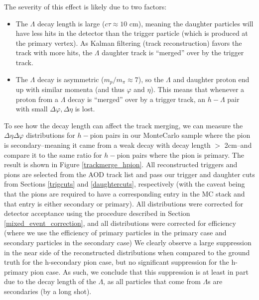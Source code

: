 \documentclass[ALICE,manyauthors]{ALICE_analysis_notes}
\begin{document}
The severity of this effect is likely due to two factors:
\begin{itemize}
\item The $\Lambda$ decay length is large ($c\tau \approx 10$ cm), meaning the daughter particles will have less hits in the detector than the trigger particle (which is produced at the primary vertex). As Kalman filtering (track reconstruction) favors the track with more hits, the $\Lambda$ daughter track is ``merged'' over by the trigger track.
\item The $\Lambda$ decay is asymmetric ($m_{p}/m_{\pi} \approx 7$), so the $\Lambda$ and daughter proton end up with similar momenta (and thus $\varphi$ and $\eta$). This means that whenever a proton from a $\Lambda$ decay is ``merged'' over by a trigger track, an $h-\Lambda$ pair with small $\Delta\varphi, \Delta\eta$ is lost.
\end{itemize}

To see how the decay length can affect the track merging, we can measure the $\Delta\eta\Delta\varphi$ distributions for $h-$pion pairs in our MonteCarlo sample where the pion is secondary--meaning it came from a weak decay with decay length $>$ 2cm--and compare it to the same ratio for $h-$pion pairs where the pion is primary. The result is shown in Figure \ref{trackmerge_hpion}. All reconstructed triggers and pions are selected from the AOD track list and pass our trigger and daughter cuts from Sections \ref{trigcuts} and \ref{daughtercuts}, respectively (with the caveat being that the pions are required to have a corresponding entry in the MC stack and that entry is either secondary or primary). All distributions were corrected for detector acceptance using the procedure described in Section \ref{mixed_event_correction}, and all distributions were corrected for efficiency (where we use the efficiency of primary particles in the primary case and secondary particles in the secondary case) We clearly observe a large suppression in the near side of the reconstructed distributions when compared to the ground truth for the h-secondary pion case, but no significant suppression for the h-primary pion case. As such, we conclude that this suppression is at least in part due to the decay length of the $\Lambda$, as all particles that come from $\Lambda$s are secondaries (by a long shot).
\end{document}
